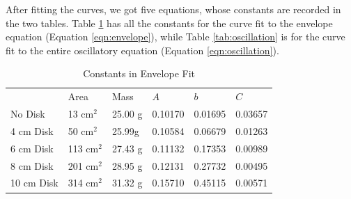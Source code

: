 \documentclass[12pt,letterpaper]{article}
\begin{document}
After fitting the curves, we got five equations, whose constants are recorded in the two tables. Table \ref{tab:envelope} has all the constants for the curve fit to the envelope equation (Equation \ref{eqn:envelope}), while Table \ref{tab:oscillation} is for the curve fit to the entire oscillatory equation (Equation \ref{eqn:oscillation}).

\begin{table}[ht]
\centering
\begin{tabular}{llllll}
                                & Area                            & Mass                         & $A$                          & $b$                          & $C$                          \\ \cline{2-6} 
\multicolumn{1}{l|}{No Disk}    & \multicolumn{1}{l|}{13 cm$^2$}  & \multicolumn{1}{l|}{25.00 g} & \multicolumn{1}{l|}{0.10170} & \multicolumn{1}{l|}{0.01695} & \multicolumn{1}{l|}{0.03657} \\ \cline{2-6} 
\multicolumn{1}{l|}{4 cm Disk}  & \multicolumn{1}{l|}{50 cm$^2$}  & \multicolumn{1}{l|}{25.99g}  & \multicolumn{1}{l|}{0.10584} & \multicolumn{1}{l|}{0.06679} & \multicolumn{1}{l|}{0.01263} \\ \cline{2-6} 
\multicolumn{1}{l|}{6 cm Disk}  & \multicolumn{1}{l|}{113 cm$^2$} & \multicolumn{1}{l|}{27.43 g} & \multicolumn{1}{l|}{0.11132} & \multicolumn{1}{l|}{0.17353} & \multicolumn{1}{l|}{0.00989} \\ \cline{2-6} 
\multicolumn{1}{l|}{8 cm Disk}  & \multicolumn{1}{l|}{201 cm$^2$} & \multicolumn{1}{l|}{28.95 g} & \multicolumn{1}{l|}{0.12131} & \multicolumn{1}{l|}{0.27732} & \multicolumn{1}{l|}{0.00495} \\ \cline{2-6} 
\multicolumn{1}{l|}{10 cm Disk} & \multicolumn{1}{l|}{314 cm$^2$} & \multicolumn{1}{l|}{31.32 g} & \multicolumn{1}{l|}{0.15710} & \multicolumn{1}{l|}{0.45115} & \multicolumn{1}{l|}{0.00571} \\ \cline{2-6} 
\end{tabular}
\caption{Constants in Envelope Fit}
\label{tab:envelope}
\end{table}
\end{document}
